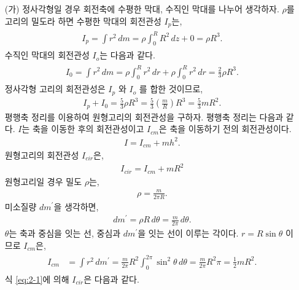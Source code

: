\documentclass[floatfix,nofootinbib,superscriptaddress,fleqn]{revtex4-2}
\begin{document}
\begin{itemize}
  \item[(가)] 
  정사각형일 경우 회전축에 수평한 막대, 수직인 막대를 나누어 생각하자. 
  $\rho$를 고리의 밀도라 하면 수평한 막대의 회전관성 $I_{p}$는,
  \begin{align}
    \begin{split}
      I_{p} = \int r^2\,dm = \rho\int_0^R R^2\,dz + 0 = \rho R^3.  
    \end{split}
  \end{align}
  수직인 막대의 회전관성 $I_{o}$는 다음과 같다.
  \begin{align}
    \begin{split}
      I_{0} = \int r^2\,dm = \rho\int_0^R r^2\,dr+\rho\int_0^R r^2\,dr
      =\frac{2}{3}\rho R^3. 
    \end{split}
  \end{align}
  정사각형 고리의 회전관성은 $I_{p}$ 와 $I_{o}$ 를 합한 것이므로,
  \begin{align}
    I_{p}+I_{0} = \frac{5}{3}\rho R^3 
    = \frac{5}{3}\left(\frac{m}{R}\right) R^3
    =  \frac{5}{3}mR^2.
  \end{align}
  평행축 정리를 이용하여 원형고리의 회전관성을 구하자. 평행축 정리는 다음과 같다.
  $I$는 축을 이동한 후의 회전관성이고 $I_{cm}$은 축을 이동하기 전의 회전관성이다. 
  \begin{align}\label{eq:2-1}
    I = I_{cm}+mh^2.
  \end{align}
  원형고리의 회전관성 $I_{cir}$은,
  \begin{align}
    I_{cir} = I_{cm}+mR^2
  \end{align}
  원형고리일 경우 밀도 $\rho$는,
  \begin{align}
    \rho = \frac{m}{2\pi R}.
  \end{align}
  미소질량 $dm^\prime$을 생각하면,
  \begin{align}
    dm^\prime = \rho R\,d\theta = \frac{m}{2\pi}\,d\theta.
  \end{align}
  $\theta$는 축과 중심을 잇는 선, 중심과 $dm^\prime$을 잇는 선이 이루는 각이다.
  $r=R\sin\theta$ 이므로 $I_{cm}$은,
  \begin{align}
    \begin{split}
      I_{cm} &= \int r^2\,dm^\prime = \frac{m}{2\pi}R^2
      \int_0^{2\pi}\sin^2\theta\,d\theta
      = \frac{m}{2\pi}R^2\pi = \frac{1}{2}mR^2.
    \end{split}
  \end{align}
  식 \eqref{eq:2-1}에 의해 $I_{cir}$은 다음과 같다.

\end{itemize}
\end{document}
